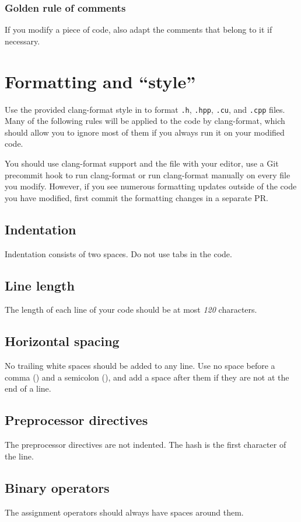 \subsubsection{Golden rule of comments}
If you modify a piece of code, also adapt the comments that belong to it if necessary.

\section{Formatting and ``style''}
Use the provided clang-format style in  to format \verb|.h|, \verb|.hpp|, \verb|.cu|, and \verb|.cpp| files. Many of the following rules will be applied to the code by clang-format, which should allow you to ignore most of them if you always run it on your modified code.

You should use clang-format support and the  file with your editor, use a Git precommit hook to run clang-format or run clang-format manually on every file you modify.  However, if you see numerous formatting updates outside of the code you have modified, first commit the formatting changes in a separate PR.

\subsection{Indentation}
Indentation consists of two spaces.
Do not use tabs in the code.

\subsection{Line length}
The length of each line of your code should be at most \emph{120} characters.

\subsection{Horizontal spacing}
No trailing white spaces should be added to any line.
Use no space before a comma (\inlinecode{,}) and a semicolon (\inlinecode{;}), and add a space after them if they are not at the end of a line.

\subsection{Preprocessor directives}
The preprocessor directives are not indented.
The hash is the first character of the line.

\subsection{Binary operators}
The assignment operators should always have spaces around them.

